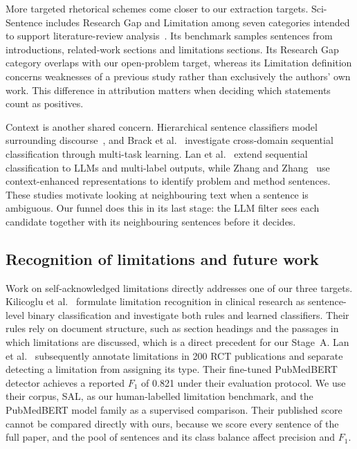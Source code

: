 More targeted rhetorical schemes come closer to our extraction targets. Sci-Sentence includes Research Gap and Limitation among seven categories intended to support literature-review analysis~\cite{bolanos2025scisentence}. Its benchmark samples sentences from introductions, related-work sections and limitations sections. Its Research Gap category overlaps with our open-problem target, whereas its Limitation definition concerns weaknesses of a previous study rather than exclusively the authors' own work. This difference in attribution matters when deciding which statements count as positives.

Context is another shared concern. Hierarchical sentence classifiers model surrounding discourse~\cite{jin2018hierarchical}, and Brack et al.~\cite{brack2024sequential} investigate cross-domain sequential classification through multi-task learning. Lan et al.~\cite{lan2024multilabel} extend sequential classification to LLMs and multi-label outputs, while Zhang and Zhang~\cite{zhang2024extracting} use context-enhanced representations to identify problem and method sentences. These studies motivate looking at neighbouring text when a sentence is ambiguous. Our funnel does this in its last stage: the LLM filter sees each candidate together with its neighbouring sentences before it decides.

\subsection{Recognition of limitations and future work}

Work on self-acknowledged limitations directly addresses one of our three targets. Kilicoglu et al.~\cite{kilicoglu2018automatic} formulate limitation recognition in clinical research as sentence-level binary classification and investigate both rules and learned classifiers. Their rules rely on document structure, such as section headings and the passages in which limitations are discussed, which is a direct precedent for our Stage~A. Lan et al.~\cite{lan2024automatic} subsequently annotate limitations in 200 RCT publications and separate detecting a limitation from assigning its type. Their fine-tuned PubMedBERT detector achieves a reported $F_1$ of 0.821 under their evaluation protocol. We use their corpus, SAL, as our human-labelled limitation benchmark, and the PubMedBERT model family as a supervised comparison. Their published score cannot be compared directly with ours, because we score every sentence of the full paper, and the pool of sentences and its class balance affect precision and $F_1$.


